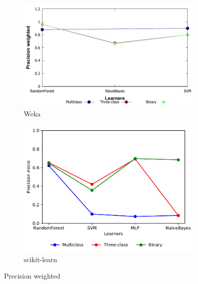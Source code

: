 \begin{figure}[H]
    \centering
    \begin{subfigure}[t]{0.5\textwidth}
        \includegraphics[width=\linewidth]{images/weka_precweight}
        \caption{Weka}
    \end{subfigure}%
    \begin{subfigure}[t]{0.42\textwidth}
        \includegraphics[width=\linewidth, page = 3]{images/precision}
        \caption{scikit-learn}
    \end{subfigure}
    \caption{Precision weighted}
    \label{fig:prec_weight}
\end{figure}

